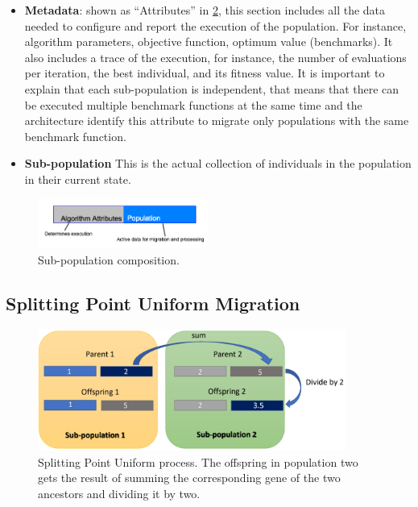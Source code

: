 \documentclass[runningheads]{llncs}
\begin{document}
\begin{itemize}
  \item {\bf Metadata}: shown as ``Attributes'' in \ref{fig4}, this
    section includes all the data needed 
  to configure and report the execution of the population.
  For instance, algorithm parameters, objective function, 
  optimum value (benchmarks). It also includes a trace of the execution, 
  for instance, the number of evaluations per iteration, 
  the best individual, and its fitness value.  
  It is important to explain that each sub-population is independent, 
  that means that there can be executed multiple benchmark functions 
  at the same time and the architecture identify this attribute to migrate
  only populations with the same benchmark function.
  \item {\bf Sub-population} This is the actual collection of individuals
  in the population in their current state.    
\end{itemize}
%
\begin{figure}[htp]
  \centering
  \includegraphics[width=0.5\textwidth]{img/subpopulationDefinition.png}
  \caption{Sub-population composition.} \label{fig3}
\end{figure}


\subsection{Splitting Point Uniform Migration} 
%
\begin{figure}[htp]
  \centering
  \includegraphics[width=0.9\textwidth]{img/splittinPointUniform.png}
  \caption{Splitting Point Uniform process. The offspring in
    population two gets the result of summing the corresponding gene
    of the two ancestors and dividing it by two.} \label{fig4}

\end{figure}
\end{document}
